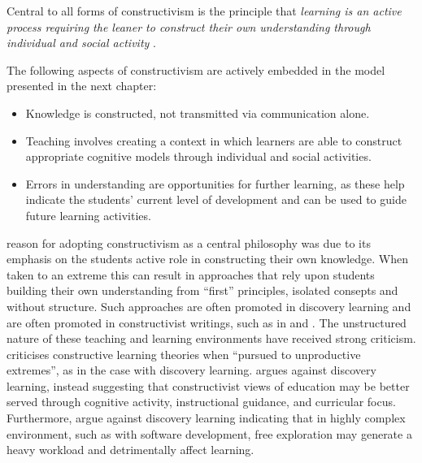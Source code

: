 Central to all forms of constructivism is the principle that \emph{learning is an active process requiring the leaner to construct their own understanding through individual and social activity} \cite{Biggs:1996c,Duffy:1996,Duffy:1992,Glasersfeld:1989,Steffe:1995}. 

%
%

The following aspects of constructivism are actively embedded in the model presented in the next chapter:
\begin{itemize}[noitemsep,nolistsep]
	\item Knowledge is constructed, not transmitted via communication alone.
	\item Teaching involves creating a context in which learners are able to construct appropriate cognitive models through individual and social activities.
	\item Errors in understanding are opportunities for further learning, as these help indicate the students' current level of development and can be used to guide future learning activities.
\end{itemize}

\citet{Biggs:1996c} reason for adopting constructivism as a central philosophy was due to its emphasis on the students active role in constructing their own knowledge. When taken to an extreme this can result in approaches that rely upon students building their own understanding from ``first'' principles, isolated consepts and without structure. Such approaches are often promoted in discovery learning \cite{Bruner:1961} and are often promoted in constructivist writings, such as in \citet{Glasersfeld:1989} and \citet{Duffy:1996}. The unstructured nature of these teaching and learning environments have received strong criticism. \citet{Anderson:1998} criticises constructive learning theories when ``pursued to unproductive extremes'', as in the case with discovery learning. \citet{Mayer:2004} argues against discovery learning, instead suggesting that constructivist views of education may be better served through cognitive activity, instructional guidance, and curricular focus. Furthermore, \citet{Kirschner:2006} argue against discovery learning indicating that in highly complex environment, such as with software development, free exploration may generate a heavy workload and detrimentally affect learning. 

%
%
%

